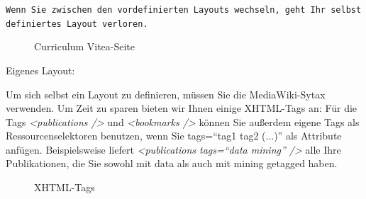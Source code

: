 \begin{mdframed}[style=tipp]\texttt{Wenn Sie zwischen den vordefinierten Layouts wechseln, geht Ihr selbst definiertes Layout verloren.} 
\end{mdframed}
\begin{figure}[h!]
 \centering
 \caption{Curriculum Vitea-Seite}
 \label{figure006}
\end{figure}  
\hypertarget{Eigenes Layout}{Eigenes Layout:}
\newline
Um sich selbst ein Layout zu definieren, müssen Sie die MediaWiki-Sytax verwenden. Um Zeit zu sparen bieten wir Ihnen einige XHTML-Tags an: %
\newline
Für die Tags \textit{<publications />} und \textit{<bookmarks />} können Sie außerdem eigene Tags als Ressourcenselektoren benutzen, wenn Sie tags=\enquote{tag1 tag2 (...)} als Attribute anfügen. Beispielsweise liefert \textit{<publications tags=\enquote{data mining} />} alle Ihre Publikationen, die Sie sowohl mit data als auch mit mining getagged haben. 
\begin{figure}[h!]
 \centering
 \caption{XHTML-Tags}
 \label{figure007}
\end{figure}  
